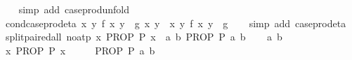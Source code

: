 \begin{isabellebody}
%
\isadelimproof
\ \ %
\endisadelimproof
%
\isatagproof
{}\isamarkupfalse%
\ {\isacharparenleft}{\kern0pt}simp\ add{\isacharcolon}{\kern0pt}\ case{\isacharunderscore}{\kern0pt}prod{\isacharunderscore}{\kern0pt}unfold{\isacharparenright}{\kern0pt}%
\endisatagproof
{\isafoldproof}%
%
\isadelimproof
\isanewline
%
\endisadelimproof
\isanewline
{}\isamarkupfalse%
\ cond{\isacharunderscore}{\kern0pt}case{\isacharunderscore}{\kern0pt}prod{\isacharunderscore}{\kern0pt}eta{\isacharcolon}{\kern0pt}\ {\isachardoublequoteopen}{\isacharparenleft}{\kern0pt}{\isasymAnd}x\ y{\isachardot}{\kern0pt}\ f\ x\ y\ {\isacharequal}{\kern0pt}\ g\ {\isacharparenleft}{\kern0pt}x{\isacharcomma}{\kern0pt}\ y{\isacharparenright}{\kern0pt}{\isacharparenright}{\kern0pt}\ {\isasymLongrightarrow}\ {\isacharparenleft}{\kern0pt}{\isasymlambda}{\isacharparenleft}{\kern0pt}x{\isacharcomma}{\kern0pt}\ y{\isacharparenright}{\kern0pt}{\isachardot}{\kern0pt}\ f\ x\ y{\isacharparenright}{\kern0pt}\ {\isacharequal}{\kern0pt}\ g{\isachardoublequoteclose}\isanewline
%
\isadelimproof
\ \ %
\endisadelimproof
%
\isatagproof
{}\isamarkupfalse%
\ {\isacharparenleft}{\kern0pt}simp\ add{\isacharcolon}{\kern0pt}\ case{\isacharunderscore}{\kern0pt}prod{\isacharunderscore}{\kern0pt}eta{\isacharparenright}{\kern0pt}%
\endisatagproof
{\isafoldproof}%
%
\isadelimproof
\isanewline
%
\endisadelimproof
\isanewline
{}\isamarkupfalse%
\ split{\isacharunderscore}{\kern0pt}paired{\isacharunderscore}{\kern0pt}all\ {\isacharbrackleft}{\kern0pt}no{\isacharunderscore}{\kern0pt}atp{\isacharbrackright}{\kern0pt}{\isacharcolon}{\kern0pt}\ {\isachardoublequoteopen}{\isacharparenleft}{\kern0pt}{\isasymAnd}x{\isachardot}{\kern0pt}\ PROP\ P\ x{\isacharparenright}{\kern0pt}\ {\isasymequiv}\ {\isacharparenleft}{\kern0pt}{\isasymAnd}a\ b{\isachardot}{\kern0pt}\ PROP\ P\ {\isacharparenleft}{\kern0pt}a{\isacharcomma}{\kern0pt}\ b{\isacharparenright}{\kern0pt}{\isacharparenright}{\kern0pt}{\isachardoublequoteclose}\isanewline
%
\isadelimproof
%
\endisadelimproof
%
\isatagproof
{}\isamarkupfalse%
\isanewline
\ \ \isamarkupfalse%
\ a\ b\isanewline
\ \ \isamarkupfalse%
\ {\isachardoublequoteopen}{\isasymAnd}x{\isachardot}{\kern0pt}\ PROP\ P\ x{\isachardoublequoteclose}\isanewline
\ \ \isamarkupfalse%
\ \isamarkupfalse%
\ {\isachardoublequoteopen}PROP\ P\ {\isacharparenleft}{\kern0pt}a{\isacharcomma}{\kern0pt}\ b{\isacharparenright}{\kern0pt}{\isachardoublequoteclose}\ \isacommand{{\isachardot}{\kern0pt}}\isamarkupfalse%

\end{isabellebody}
